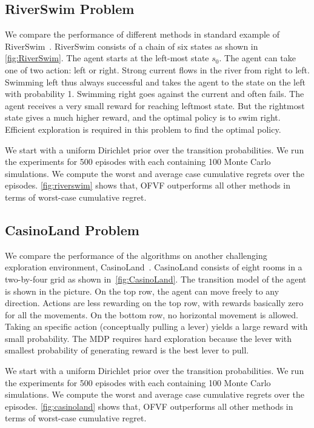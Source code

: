 \documentclass{article}
\theoremstyle{plain}
\theoremstyle{definition}
\begin{document}
\subsection{RiverSwim Problem}


We compare the performance of different methods in standard example of
RiverSwim~\citep{Osband2013, Strehl2004}. RiverSwim consists of a
chain of six states as shown in \cref{fig:RiverSwim}. The agent starts
at the left-most state $s_0$. The agent can take one of two action:
left or right. Strong current flows in the river from right to left.
Swimming left thus always successful and takes the agent to the state
on the left with probability 1. Swimming right goes against the
current and often fails. The agent receives a very small reward for
reaching leftmost state. But the rightmost state gives a much higher
reward, and the optimal policy is to swim right. Efficient exploration
is required in this problem to find the optimal policy.

We start with a uniform Dirichlet prior over the transition
probabilities. We run the experiments for 500 episodes with each
containing 100 Monte Carlo simulations. We compute the worst and
average case cumulative regrets over the episodes.
\cref{fig:riverswim} shows that, OFVF outperforms all other methods in
terms of worst-case cumulative regret.

\subsection{CasinoLand Problem}
We compare the performance of the algorithms on another challenging exploration environment, CasinoLand~\citep{Strehl2004}. CasinoLand consists of eight rooms in a two-by-four grid as shown in~\cref{fig:CasinoLand}. The transition model of the agent is shown in the picture. On the top row, the agent can move freely to any direction. Actions are less rewarding on the top row, with rewards basically zero for all the movements. On the bottom row, no horizontal movement is allowed. Taking an specific action (conceptually pulling a lever) yields a large reward with small probability. The MDP requires hard exploration because the lever with smallest probability of generating reward is the best lever to pull.

We start with a uniform Dirichlet prior over the transition
probabilities. We run the experiments for 500 episodes with each
containing 100 Monte Carlo simulations. We compute the worst and
average case cumulative regrets over the episodes.
\cref{fig:casinoland} shows that, OFVF outperforms all other methods
in terms of worst-case cumulative regret.
\end{document}
